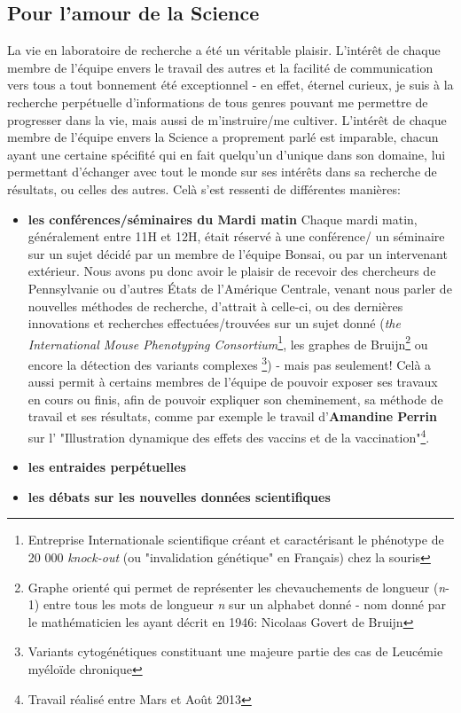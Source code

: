 \documentclass{report}
\begin{document}
\subsection{Pour l'amour de la Science}
La vie en laboratoire de recherche a été un véritable plaisir.
\newline
L'intérêt de chaque membre de l'équipe envers le travail des autres et la facilité de communication vers tous a tout bonnement été exceptionnel - en effet, éternel curieux, je suis à la recherche perpétuelle d'informations de tous genres pouvant me permettre de progresser dans la vie, mais aussi de m'instruire/me cultiver. L'intérêt de chaque membre de l'équipe envers la Science a proprement parlé est imparable, chacun ayant une certaine spécifité qui en fait quelqu'un d'unique dans son domaine, lui permettant d'échanger avec tout le monde sur ses intérêts dans sa recherche de résultats, ou celles des autres.
\newline
Celà s'est ressenti de différentes manières:
\begin{itemize}
\item \textbf{les conférences/séminaires du Mardi matin}
	\newline
	Chaque mardi matin, généralement entre 11H et 12H, était réservé à une conférence/ un séminaire sur un sujet décidé par un membre de l'équipe Bonsai, ou par un intervenant extérieur.
	\newline
	Nous avons pu donc avoir le plaisir de recevoir des chercheurs de Pennsylvanie ou d'autres États de l'Amérique Centrale, venant nous parler de nouvelles méthodes de recherche, d'attrait à celle-ci, ou des dernières innovations et recherches effectuées/trouvées sur un sujet donné (\textit{the International Mouse Phenotyping Consortium}\footnote{Entreprise Internationale scientifique créant et caractérisant le phénotype de 20 000 \textit{knock-out} (ou "invalidation génétique" en Français) chez la souris}, les graphes de Bruijn\footnote{Graphe orienté qui permet de représenter les chevauchements de longueur (\textit{n}-1) entre tous les mots de longueur \textit{n} sur un alphabet donné - nom donné par le mathématicien les ayant décrit en 1946: Nicolaas Govert de Bruijn} ou encore la détection des variants complexes \footnote{Variants cytogénétiques constituant une majeure partie des cas de Leucémie myéloïde chronique}) -  mais pas seulement!
	\newline
	Celà a aussi permit à certains membres de l'équipe de pouvoir exposer ses travaux en cours ou finis, afin de pouvoir expliquer son cheminement, sa méthode de travail et ses résultats, comme par exemple le travail d'\textbf{Amandine Perrin} sur l' "Illustration dynamique des effets des vaccins et de la vaccination"\footnote{Travail réalisé entre Mars et Août 2013}.
\item \textbf{les entraides perpétuelles}
	\newline
	
\item \textbf{les débats sur les nouvelles données scientifiques}
	\newline
	
\end{itemize}
\end{document}
